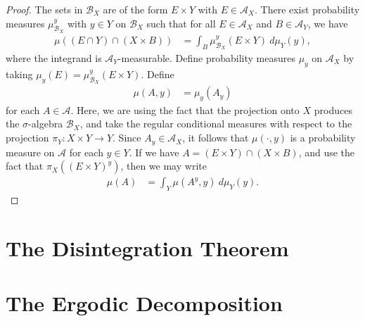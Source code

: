 \documentclass[10pt]{mypackage}
\begin{document}
\begin{proof}
  The sets in $\mathcal{B}_X$ are of the form $E\times Y$ with $E\in \mathcal{A}_X$. There exist probability measures $\mu^y_{\mathcal{B}_X}$ with $y\in Y$ on $\mathcal{B}_X$ such that for all $E\in \mathcal{A}_X$ and $B \in \mathcal{A}_Y$, we have
  \begin{align*}
    \mu\left( \left( E\cap Y \right)\cap \left( X\times B \right) \right) &= \int_{B}^{} \mu^y_{\mathcal{B}_X}\left( E\times Y \right)\:d\mu_Y(y),
  \end{align*}
  where the integrand is $\mathcal{A}_Y$-measurable. Define probability measures $\mu_y$ on $\mathcal{A}_X$ by taking $\mu_y(E) = \mu^y_{\mathcal{B}_X}\left( E\times Y \right)$. Define
  \begin{align*}
    \mu\left( A,y \right) &= \mu_y\left( A_y \right)
  \end{align*}
  for each $A\in \mathcal{A}$. Here, we are using the fact that the projection onto $X$ produces the $\sigma$-algebra $\mathcal{B}_X$, and take the regular conditional measures with respect to the projection $\pi_Y\colon X\times Y\to Y$. Since $A_y\in \mathcal{A}_X$, it follows that $\mu\left( \cdot,y \right)$ is a probability measure on $\mathcal{A}$ for each $y\in Y$. If we have $A = \left( E\times Y \right)\cap \left( X\times B \right)$, and use the fact that $\pi_X\left( \left( E\times Y \right)^{y} \right)$, then we may write
  \begin{align*}
    \mu\left( A \right) &= \int_{Y}^{} \mu\left( A^y,y \right)\:d\mu_Y(y).
  \end{align*}
\end{proof}
\section{The Disintegration Theorem}%

\section{The Ergodic Decomposition}%

\nocite{measure_theory_bogachev,einsiedler_and_ward}
\printbibliography
\end{document}
